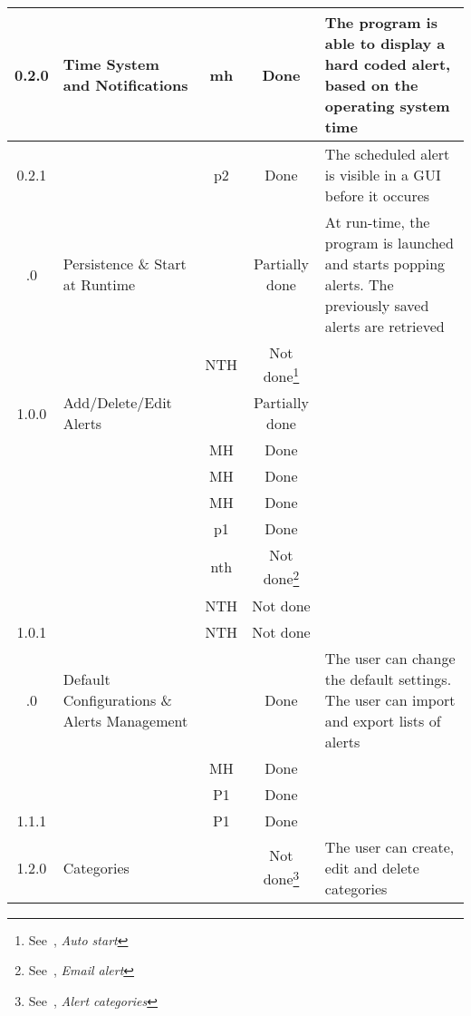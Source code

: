 \begin{longtable}{| c | p{5cm} | c | c | p{5cm} |}
	\rowcolor{aliceblue}0.2.0 & Time System and Notifications & \gls{mh} & Done & The program is able to display a hard coded alert, based on the operating system time \\ \hline
	\rowcolor{aliceblue}0.2.1 & \fullref{subsec:usecase_launch} & \gls{p2} & Done & The scheduled alert is visible in a GUI before it occures \\ \boldhr
	0.3.0 & Persistence \& Start at Runtime & & Partially done & At run-time, the program is launched and starts popping alerts. The previously saved alerts are retrieved \\ \hline
	& \fullref{subsec:usecase_auto_start} & NTH & Not done\footnote{\label{ftn:autostart}See~\fullref{sec:unimplreq}, \textit{Auto start}} & \\ \boldhr
	\rowcolor{aliceblue}1.0.0 & Add/Delete/Edit Alerts & & Partially done &  \\ \hline
	\rowcolor{aliceblue}& \fullref{subsec:usecase_add_simple_alert} & MH & Done &  \\ \hline
	\rowcolor{aliceblue}& \fullref{subsec:usecase_delete_simple_alert} & MH & Done &  \\ \hline
	\rowcolor{aliceblue}& \fullref{subsec:usecase_edit_simple_alert} & MH & Done &  \\ \hline
	\rowcolor{aliceblue}& \fullref{subsec:usecase_add_periodic_alert} & \gls{p1} & Done &  \\ \hline
	\rowcolor{aliceblue}& \fullref{subsec:usecase_add_email_sender} & \gls{nth} & Not done\footnote{\label{ftn:emailreq}See~\fullref{sec:unimplreq}, \textit{Email alert}} &  \\ \hline
	\rowcolor{aliceblue}& \fullref{subsec:usecase_delete_email_sender} & NTH & Not done\footref{ftn:emailreq} &  \\ \hline
	\rowcolor{aliceblue}1.0.1 & \fullref{subsec:usecase_edit_email_sender} & NTH & Not done\footref{ftn:emailreq} &  \\ \boldhr
	1.1.0 & Default Configurations \& Alerts Management &  & Done & The user can change the default settings. The user can import and export lists of alerts\\ \hline
	& \fullref{subsec:usecase_edit_default_configuration} & MH & Done & \\ \hline
	& \fullref{subsec:usecase_import_alerts} & P1 & Done & \\ \hline
	1.1.1 & \fullref{subsec:usecase_export_alerts} & P1 & Done &\\ \boldhr
	\rowcolor{aliceblue}1.2.0 & Categories & & Not done\footnote{\label{ftn:categories}See~\fullref{sec:unimplreq}, \textit{Alert categories}} & The user can create, edit and delete categories \\ \hline

\end{longtable}
